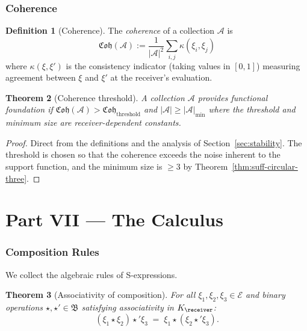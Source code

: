 \documentclass[11pt,a4paper]{article}
\theoremstyle{thmstyle}
\newtheorem{theorem}{Theorem}[section]
\theoremstyle{thmstyle}
\theoremstyle{definition}
\newtheorem{definition}[theorem]{Definition}
\theoremstyle{remark}
\newcommand{\Expr}{\mathcal{E}}
\newcommand{\Ax}{\mathcal{A}}
\newcommand{\Cohere}{\mathfrak{Coh}}
\begin{document}
\section{Coherence}
\label{sec:coherence}

\begin{definition}[Coherence]\label{def:coherence}
The \emph{coherence} of a collection $\Ax$ is
\[
\Cohere(\Ax)
:= \frac{1}{|\Ax|^{2}}
   \sum_{i, j} \kappa(\xi_{i}, \xi_{j})
\]
where $\kappa(\xi, \xi')$ is the consistency
indicator (taking values in $[0, 1]$) measuring
agreement between $\xi$ and $\xi'$ at the
receiver's evaluation.
\end{definition}

\begin{theorem}[Coherence threshold]\label{thm:coh-threshold}
A collection $\Ax$ provides functional foundation if
$\Cohere(\Ax) > \Cohere_{\mathrm{threshold}}$ and
$|\Ax| \geq |\Ax|_{\min}$ where the threshold and
minimum size are receiver-dependent constants.
\end{theorem}

\begin{proof}
Direct from the definitions and the analysis of
Section~\ref{sec:stability}.  The threshold is
chosen so that the coherence exceeds the noise
inherent to the support function, and the minimum
size is $\geq 3$ by Theorem~\ref{thm:suff-circular-three}.
\end{proof}

\clearpage

\part*{Part VII --- The Calculus}

\section{Composition Rules}
\label{sec:composition-rules}

We collect the algebraic rules of S-expressions.

\begin{theorem}[Associativity of composition]
\label{thm:assoc}
For all $\xi_{1}, \xi_{2}, \xi_{3} \in \Expr$ and
binary operations $\star, \star' \in \mathfrak{B}$
satisfying associativity in $K_{\receiver}$:
\[
(\xi_{1} \star \xi_{2}) \star' \xi_{3}
\;=\; \xi_{1} \star (\xi_{2} \star' \xi_{3}).
\]
\end{theorem}
\end{document}
